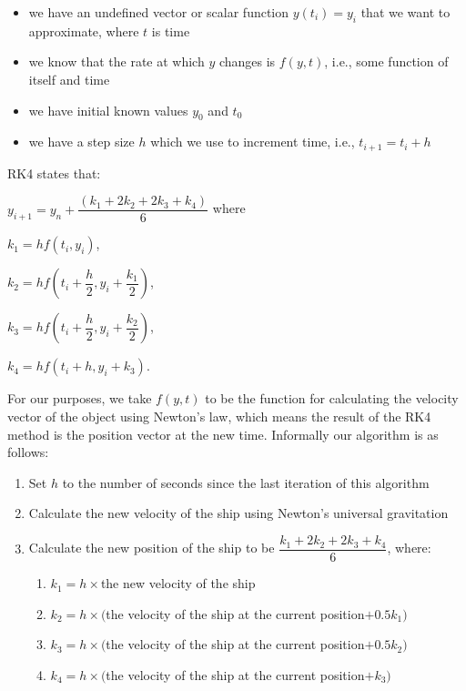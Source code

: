 \begin{itemize}
\item we have an undefined vector or scalar function $y(t_i) = y_i$ that we want to approximate, where $t$ is time
\item we know that the rate at which $y$ changes is $f(y,t)$, i.e., some function of itself and time
\item we have initial known values $y_0$ and $t_0$
\item we have a step size $h$ which we use to increment time, i.e., $t_{i+1} = t_i + h$
\end{itemize}

RK4 states that:

\begin{center}
$y_{i+1} = y_n + \dfrac{(k_1 + 2k_2 + 2k_3 + k_4)}{6}$ where

$k_1 = hf(t_i, y_i)$,

$k_2 = hf(t_i + \dfrac{h}{2}, y_i + \dfrac{k_1}{2})$,

$k_3 = hf(t_i + \dfrac{h}{2}, y_i + \dfrac{k_2}{2})$,

$k_4 = hf(t_i + h, y_i + k_3)$.
\end{center}

For our purposes, we take $f(y,t)$ to be the function for calculating the velocity vector of the object using Newton's law, which means the result of the RK4 method is the position vector at the new time.  Informally our algorithm is as follows:

\begin{enumerate}
\item Set $h$ to the number of seconds since the last iteration of this algorithm
\item Calculate the new velocity of the ship using Newton's universal gravitation
\item Calculate the new position of the ship to be $\dfrac{k_1 + 2k_2 + 2k_3 + k_4}{6}$, where:
\begin{enumerate}
\item $k_1 = h \times$the new velocity of the ship
\item $k_2 = h \times($the velocity of the ship at the current position$+0.5k_1)$
\item $k_3 = h \times($the velocity of the ship at the current position$+0.5k_2)$
\item $k_4 = h \times($the velocity of the ship at the current position$+k_3)$
\end{enumerate}
\end{enumerate}

